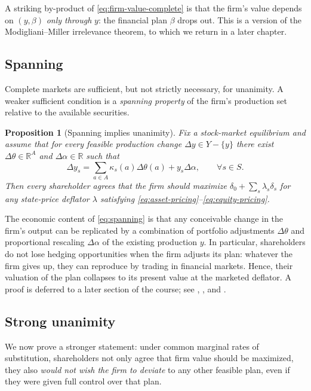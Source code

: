 \documentclass[11pt,a4paper,oneside]{book}
\def\R{\mathbb{R}}
\theoremstyle{plain}
\newtheorem{proposition}[theorem]{Proposition}
\theoremstyle{definition}
\theoremstyle{remark}
\numberwithin{equation}{chapter}
\begin{document}
A striking by-product of \eqref{eq:firm-value-complete} is that the firm's value depends on $(y, \beta)$ \emph{only through} $y$: the financial plan $\beta$ drops out.
This is a version of the Modigliani--Miller irrelevance theorem, to which we return in a later chapter.

\subsection{Spanning}

Complete markets are sufficient, but not strictly necessary, for unanimity.
A weaker sufficient condition is a \emph{spanning property} of the firm's production set relative to the available securities.

\begin{proposition}[Spanning implies unanimity]\label{prop:spanning}
Fix a stock-market equilibrium and assume that for every feasible production change $\Delta y \in Y - \{ y \}$ there exist $\Delta \theta \in \R^A$ and $\Delta \alpha \in \R$ such that
\begin{equation}\label{eq:spanning}
  \Delta y_s = \sum_{a \in A} \kappa_s(a) \Delta \theta(a) + y_s \Delta \alpha,
  \qquad \forall s \in S.
\end{equation}
Then every shareholder agrees that the firm should maximize $\delta_0 + \sum_s \lambda_s \delta_s$ for \emph{any} state-price deflator $\lambda$ satisfying \eqref{eq:asset-pricing}--\eqref{eq:equity-pricing}.
\end{proposition}

The economic content of \eqref{eq:spanning} is that any conceivable change in the firm's output can be replicated by a combination of portfolio adjustments $\Delta \theta$ and proportional rescaling $\Delta \alpha$ of the existing production $y$.
In particular, shareholders do not lose hedging opportunities when the firm adjusts its plan: whatever the firm gives up, they can reproduce by trading in financial markets.
Hence, their valuation of the plan collapses to its present value at the marketed deflator.
A proof is deferred to a later section of the course; see \citet{EkernWilson1974}, \citet{Leland1974}, and \citet{MagillQuinzii2009}.

\subsection{Strong unanimity}

We now prove a stronger statement: under common marginal rates of substitution, shareholders not only agree that firm value should be maximized, they also \emph{would not wish the firm to deviate} to any other feasible plan, even if they were given full control over that plan.
\end{document}
